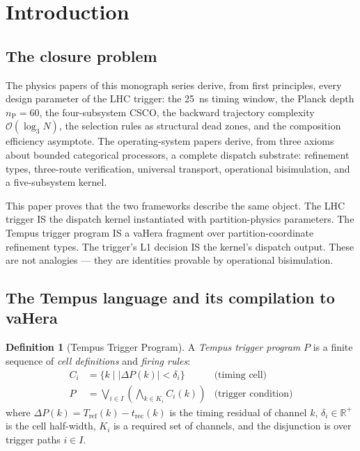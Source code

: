 \documentclass[twocolumn,10pt,a4paper]{article}
\theoremstyle{thmstyle}
\theoremstyle{definition}
\newtheorem{definition}[theorem]{Definition}
\theoremstyle{remark}
\newcommand{\R}{\mathbb{R}}
\newcommand{\nP}{n_{\mathrm{P}}}
\newcommand{\DeltaP}{\Delta P}
\begin{document}
\tableofcontents

\section{Introduction}
\label{sec:intro}

\subsection{The closure problem}

The physics papers of this monograph series derive, from first principles,
every design parameter of the LHC trigger: the 25~ns timing window, the
Planck depth $\nP = 60$, the four-subsystem CSCO, the backward trajectory
complexity $\mathcal{O}(\log_3 N)$, the selection rules as structural dead
zones, and the composition efficiency asymptote. The operating-system papers
derive, from three axioms about bounded categorical processors, a complete
dispatch substrate: refinement types, three-route verification, universal
transport, operational bisimulation, and a five-subsystem kernel.

This paper proves that the two frameworks describe the same object. The
LHC trigger IS the dispatch kernel instantiated with partition-physics
parameters. The Tempus trigger program IS a vaHera fragment over
partition-coordinate refinement types. The trigger's L1 decision IS the
kernel's dispatch output. These are not analogies — they are identities
provable by operational bisimulation.

\subsection{The Tempus language and its compilation to vaHera}

\begin{definition}[Tempus Trigger Program]
\label{def:tempus}
A \emph{Tempus trigger program} $P$ is a finite sequence of
\emph{cell definitions} and \emph{firing rules}:
\begin{align}
C_i &= \{k \mid |\DeltaP(k)| < \delta_i\} & \text{(timing cell)} \label{eq:cell}\\
P &= \bigvee_{i \in I} \left(\bigwedge_{k \in K_i} C_i(k)\right)
& \text{(trigger condition)} \label{eq:trigger}
\end{align}
where $\DeltaP(k) = T_{\mathrm{ref}}(k) - t_{\mathrm{rec}}(k)$ is the
timing residual of channel $k$, $\delta_i \in \R^+$ is the cell half-width,
$K_i$ is a required set of channels, and the disjunction is over trigger
paths $i \in I$.
\end{definition}
\end{document}
